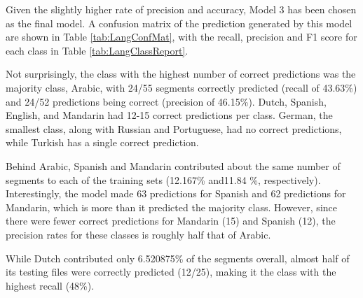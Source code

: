 Given the slightly higher rate of precision and accuracy, Model 3 has been chosen as the final model. A confusion matrix of the prediction generated by this model are shown in Table \ref{tab:LangConfMat}, with the recall, precision and F1 score for each class in Table \ref{tab:LangClassReport}.

Not surprisingly, the class with the highest number of correct predictions was the majority class, Arabic, with 24/55 segments correctly predicted (recall of 43.63\%) and 24/52 predictions being correct (precision of 46.15\%). Dutch, Spanish, English, and Mandarin had 12-15 correct predictions per class. German, the smallest class, along with Russian and Portuguese, had no correct predictions, while Turkish has a single correct prediction.

Behind Arabic, Spanish and Mandarin contributed about the same number of segments to each of the training sets (12.167\% and11.84 \%, respectively). Interestingly, the model made 63 predictions for Spanish and 62 predictions  for Mandarin, which is more than it predicted the majority class. However, since there were fewer correct predictions for Mandarin (15) and Spanish (12), the precision rates for these classes is roughly half that of Arabic.

While Dutch contributed only 6.520875\% of the segments overall, almost half of its testing files were correctly predicted (12/25), making it the class with the highest recall (48\%).

